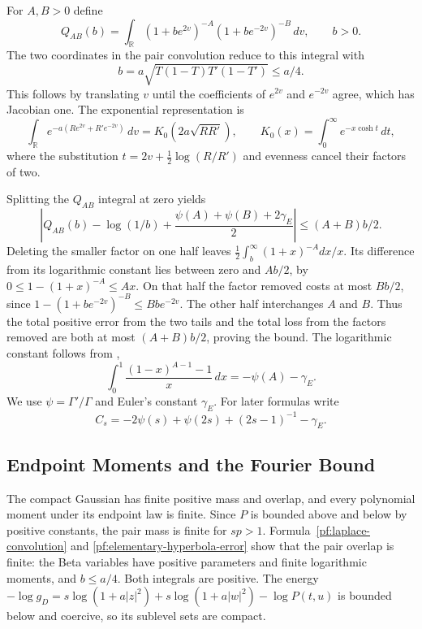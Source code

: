 For $A,B>0$ define
\[
 Q_{AB}(b)=\int_{\mathbb R}
 (1+be^{2v})^{-A}(1+be^{-2v})^{-B}\,dv,\qquad b>0.
\]
The two coordinates in the pair convolution reduce to this integral with
\[
 b=a\sqrt{T(1-T)T'(1-T')}\le a/4.
\]
This follows by translating $v$ until the coefficients of $e^{2v}$ and
$e^{-2v}$ agree, which has Jacobian one. The exponential representation is
\[
 \int_{\mathbb R}e^{-a(Re^{2v}+R'e^{-2v})}\,dv
 =K_0(2a\sqrt{RR'}),\qquad
 K_0(x)=\int_0^\infty e^{-x\cosh t}\,dt,
\]
where the substitution $t=2v+\frac12\log(R/R')$ and evenness cancel
their factors of two.

Splitting the $Q_{AB}$ integral at zero yields
\begin{equation}\label{pf:elementary-hyperbola-error}
 \left|Q_{AB}(b)-\log(1/b)
       +\frac{\psi(A)+\psi(B)+2\gamma_E}{2}\right|
 \le (A+B)b/2.
\end{equation}
Deleting the smaller factor on one half leaves
$\frac12\int_b^\infty(1+x)^{-A}dx/x$. Its difference from its
logarithmic constant lies between zero and $Ab/2$, by
$0\le1-(1+x)^{-A}\le Ax$. On that half the factor removed costs at most
$Bb/2$, since $1-(1+be^{-2v})^{-B}\le Bbe^{-2v}$.
The other half interchanges $A$ and $B$. Thus the total positive error
from the two tails and the total loss from the factors removed are both
at most $(A+B)b/2$, proving the bound. The logarithmic constant follows
from \cite[Equation~(5.9.16)]{DLMF},
\[
 \int_0^1\frac{(1-x)^{A-1}-1}{x}\,dx=-\psi(A)-\gamma_E.
\]
We use $\psi=\Gamma'/\Gamma$ and Euler's constant $\gamma_E$. For later
formulas write
\begin{equation}\label{pf:student-constant}
 C_s=-2\psi(s)+\psi(2s)+(2s-1)^{-1}-\gamma_E.
\end{equation}

\subsection{Endpoint Moments and the Fourier Bound}

The compact Gaussian has finite positive mass and overlap, and every
polynomial moment under its endpoint law is finite. Since $P$ is bounded
above and below by positive constants, the pair mass is finite for
$sp>1$. Formula~\eqref{pf:laplace-convolution} and
\eqref{pf:elementary-hyperbola-error} show that the pair overlap is finite:
the Beta variables have positive parameters and finite logarithmic
moments, and $b\le a/4$. Both integrals are positive. The energy
$-\log g_D=s\log(1+a|z|^2)+s\log(1+a|w|^2)-\log P(t,u)$ is bounded
below and coercive, so its sublevel sets are compact.

